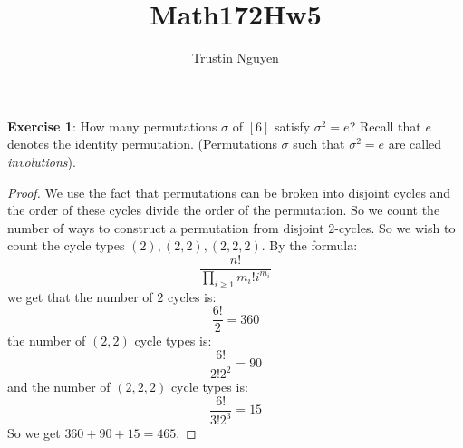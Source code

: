 \documentclass{article}
\title{Math172Hw5}
\author{Trustin Nguyen}
\begin{document}
    \maketitle

\reversemarginpar

\textbf{Exercise 1}: How many permutations $\sigma$ of $[6]$ satisfy $\sigma^{2} = e$? Recall that $e$ denotes the identity permutation. (Permutations $\sigma$ such that $\sigma^{2} = e$ are called \textit{involutions}).
        \begin{proof}
            We use the fact that permutations can be broken into disjoint cycles and the order of these cycles divide the order of the permutation. So we count the number of ways to construct a permutation from disjoint $2$-cycles. So we wish to count the cycle types $(2), (2, 2), (2, 2, 2)$. By the formula:
                \begin{equation*}
                    \dfrac{n!}{\prod_{i \geq 1}^{} m_{i}!i^{m_{i}}}
                \end{equation*}
            we get that the number of $2$ cycles is:
                \begin{equation*}
                    \dfrac{6!}{2} = 360
                \end{equation*}
            the number of $(2, 2)$ cycle types is:
                \begin{equation*}
                    \dfrac{6!}{2!2^{2}} = 90
                \end{equation*}
            and the number of $(2, 2, 2)$ cycle types is:
                \begin{equation*}
                    \dfrac{6!}{3!2^{3}} = 15
                \end{equation*}
            So we get $360 + 90 + 15 = 465$.
        \end{proof}
\end{document}
